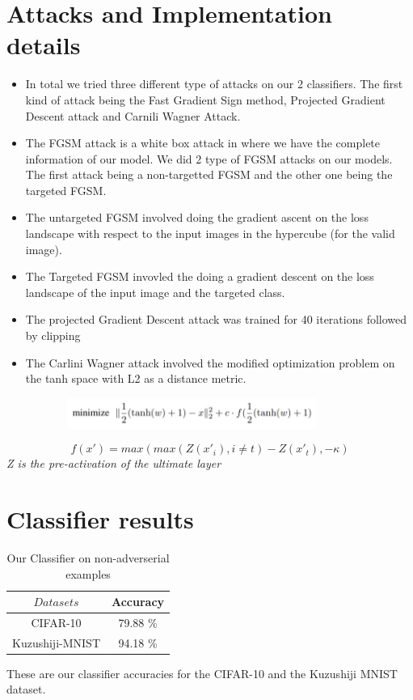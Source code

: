 \documentclass[11pt]{article}
\begin{document}
\section{Attacks and Implementation details}
\begin{itemize}
    \item In total we tried three different type of attacks on our 2 classifiers. The first kind of attack being the Fast Gradient Sign method, Projected Gradient Descent attack and Carnili Wagner Attack. 
    \item The FGSM attack is a white box attack in where we have the complete information of our model. We did 2 type of FGSM attacks on our models. The first attack being a non-targetted FGSM and the other one being the targeted FGSM. 
    \item The untargeted FGSM involved doing the gradient ascent on the loss landscape with respect to the input images in the hypercube (for the valid image).
    \item The Targeted FGSM invovled the doing a gradient descent on the loss landscape of the input image and the targeted class. 
    \item The projected Gradient Descent attack was trained for 40 iterations followed by clipping
    \item The Carlini Wagner attack involved the modified optimization problem on the tanh space with L2 as a distance metric. 
\end{itemize}
\begin{center}
        \begin{figure}[h]
        \centering
          \includegraphics[width=100mm, height=10mm]{CW.PNG}
        \end{figure}
\end{center}
\[f(x') = max(max(Z(x'_i), i\neq t ) -  Z(x'_t), -\kappa ) \]
\emph{Z is the pre-activation of the ultimate layer}
\section{Classifier results}
\begin{table}[!h]
\centering
\begin{tabular}{c|c}
$Datasets$& Accuracy  \\\hline
CIFAR-10 & 79.88 \% \\
Kuzushiji-MNIST	& 94.18 \% 
\end{tabular}
\caption{\label{Table 1: } Our Classifier on non-adverserial examples}
\end{table}
These are our classifier accuracies for the CIFAR-10 and the Kuzushiji MNIST dataset.
\end{document}
